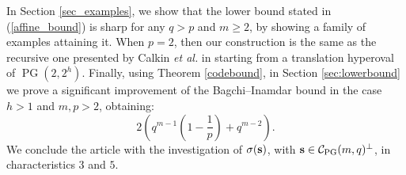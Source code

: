 \documentclass[12pt]{article}
\newcommand{\cC}{{\mathcal C}}
\newcommand{\cM}{{\mathcal M}}
\renewcommand{\mod}{\hbox{{\rm mod}\,}}
\DeclareMathOperator{\PG}{{PG}}
\DeclareMathOperator{\AG}{{AG}}
\begin{document}
	
	
	
	In Section \ref{sec_examples}, we show that the lower bound stated in (\ref{affine_bound}) is sharp for any $q>p$ and $m \geq 2$, by showing a family of examples attaining it. When $p=2$, then our construction is the same as the recursive one presented by Calkin \textit{et al.} in \cite[Section 3]{DeResmini} starting from a translation hyperoval of $\PG(2,2^h)$. Finally, using Theorem \ref{codebound}, in Section \ref{sec:lowerbound} we prove a significant improvement of the Bagchi--Inamdar bound in the case  $h>1$ and $m, p > 2$, obtaining:
	\[2\left(q^{m-1}\left(1-\frac1p\right)+q^{m-2}\right).\]
	We conclude the article with the investigation of $\sigma({\bf s})$, with ${\bf s} \in \cC_{\PG}(m,q)^\perp$, in characteristics $3$ and $5$. 
	
	
	
	
	
\end{document}
